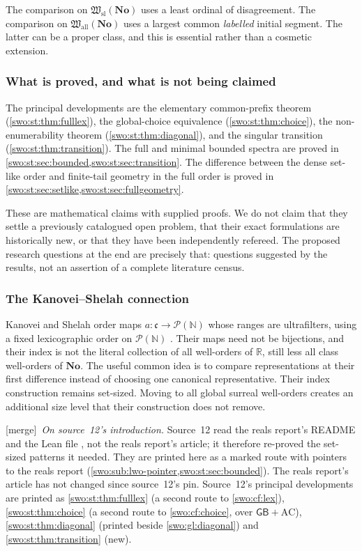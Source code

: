 \documentclass[11pt]{article}
\theoremstyle{definition}
\theoremstyle{remark}
\newcommand{\No}{\mathbf{No}}
\newcommand{\Hsl}{\mathfrak W_{\mathrm{sl}}}
\newcommand{\Hall}{\mathfrak W_{\mathrm{all}}}
\newcommand{\GB}{\mathsf{GB}}
\newcommand{\merge}{\textsf{[merge]}}
\begin{document}
The comparison on $\Hsl(\No)$ uses a least ordinal of disagreement.
The comparison on $\Hall(\No)$ uses a largest common
\emph{labelled} initial segment. The latter can be a proper class, and
this is essential rather than a cosmetic extension.

\subsubsection{What is proved, and what is not being claimed}

The principal developments are the elementary common-prefix theorem
(\cref{swo:st:thm:fulllex}), the global-choice equivalence
(\cref{swo:st:thm:choice}), the non-enumerability theorem
(\cref{swo:st:thm:diagonal}), and the singular transition
(\cref{swo:st:thm:transition}). The full and minimal bounded spectra are proved
in \cref{swo:st:sec:bounded,swo:st:sec:transition}. The difference between the dense
set-like order and finite-tail geometry in the full order is proved in
\cref{swo:st:sec:setlike,swo:st:sec:fullgeometry}.

These are mathematical claims with supplied proofs. We do not claim
that they settle a previously catalogued open problem, that their exact
formulations are historically new, or that they have been independently
refereed. The proposed research questions at the end are precisely that:
questions suggested by the results, not an assertion of a complete
literature census.

\subsubsection{The Kanovei--Shelah connection}

Kanovei and Shelah order maps
$a:\mathfrak c\to\mathcal P(\mathbb N)$ whose ranges are ultrafilters,
using a fixed lexicographic order on $\mathcal P(\mathbb N)$
\cite[\S1]{KanoveiShelah}. Their maps need not be bijections, and their index is not
the literal collection of all well-orders of $\mathbb R$, still less all
class well-orders of $\No$. The useful common idea is to compare
representations at their first difference instead of choosing one
canonical representative. Their index construction remains set-sized.
Moving to all global surreal well-orders creates an additional size level
that their construction does not remove.


\merge\ \emph{On source~12's introduction.} Source~12 read the reals
report's README and the Lean file , not the
reals report's article; it therefore re-proved the set-sized patterns it
needed. They are printed here as a marked route with pointers to the reals
report (\cref{swo:sub:lwo-pointer,swo:st:sec:bounded}). The reals report's
article has not changed since source~12's pin. Source~12's principal
developments are printed as \cref{swo:st:thm:fulllex} (a second route to
\cref{swo:cf:lex}), \cref{swo:st:thm:choice} (a second route to
\cref{swo:cf:choice}, over $\GB+\mathrm{AC}$), \cref{swo:st:thm:diagonal}
(printed beside \cref{swo:gl:diagonal}) and \cref{swo:st:thm:transition}
(new).
\end{document}
